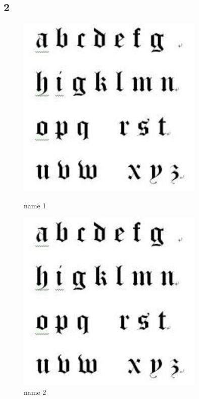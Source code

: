 \documentclass{article}
\begin{document}
\subsection{2}
\begin{figure}[H]
\centering %

\begin{minipage}[b]{0.45\textwidth} %
\centering %
\includegraphics[width=0.8\textwidth]{figures/abc.jpeg} %
\caption{name 1}
\label{Fig.1}
\end{minipage}

\begin{minipage}[b]{0.45\textwidth} %
\centering %
\includegraphics[width=0.8\textwidth]{figures/abc.jpeg}%
\caption{name 2}
\label{Fig.2}
\end{minipage}

\end{figure}
\end{document}
